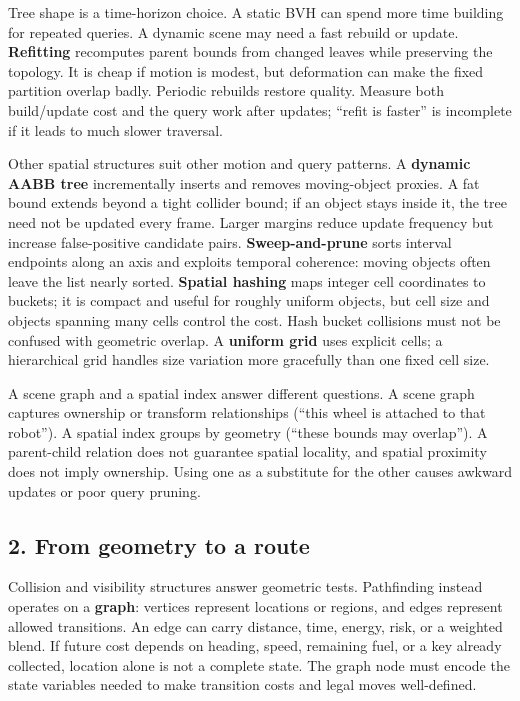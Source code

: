 Tree shape is a time-horizon choice. A static BVH can spend more time building for repeated queries. A dynamic scene may need a fast rebuild or update. \textbf{Refitting} recomputes parent bounds from changed leaves while preserving the topology. It is cheap if motion is modest, but deformation can make the fixed partition overlap badly. Periodic rebuilds restore quality. Measure both build/update cost and the query work after updates; ``refit is faster'' is incomplete if it leads to much slower traversal.

Other spatial structures suit other motion and query patterns. A \textbf{dynamic AABB tree} incrementally inserts and removes moving-object proxies. A fat bound extends beyond a tight collider bound; if an object stays inside it, the tree need not be updated every frame. Larger margins reduce update frequency but increase false-positive candidate pairs. \textbf{Sweep-and-prune} sorts interval endpoints along an axis and exploits temporal coherence: moving objects often leave the list nearly sorted. \textbf{Spatial hashing} maps integer cell coordinates to buckets; it is compact and useful for roughly uniform objects, but cell size and objects spanning many cells control the cost. Hash bucket collisions must not be confused with geometric overlap. A \textbf{uniform grid} uses explicit cells; a hierarchical grid handles size variation more gracefully than one fixed cell size.

A scene graph and a spatial index answer different questions. A scene graph captures ownership or transform relationships (``this wheel is attached to that robot''). A spatial index groups by geometry (``these bounds may overlap''). A parent-child relation does not guarantee spatial locality, and spatial proximity does not imply ownership. Using one as a substitute for the other causes awkward updates or poor query pruning.

\subsection{2. From geometry to a route}\label{05-engine-i-ch008-from-geometry-to-a-route}

\hypertarget{05-engine-i-ch008-from-geometry-to-a-route}{}

Collision and visibility structures answer geometric tests. Pathfinding instead operates on a \textbf{graph}: vertices represent locations or regions, and edges represent allowed transitions. An edge can carry distance, time, energy, risk, or a weighted blend. If future cost depends on heading, speed, remaining fuel, or a key already collected, location alone is not a complete state. The graph node must encode the state variables needed to make transition costs and legal moves well-defined.

